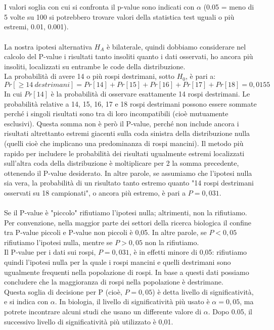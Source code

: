 \documentclass[10pt, draft]{book}
\begin{document}
\\
\\
I valori soglia con cui si confronta il p-value sono indicati con $\alpha$ (0.05 = meno di 5 volte su 100 si potrebbero trovare valori della statistica test uguali o più estremi, 0.01, 0.001).
\\
\\
La nostra ipotesi alternativa $H_A$ è bilaterale, quindi dobbiamo considerare nel calcolo del P-value i risultati tanto insoliti quanto i dati osservati, ho ancora più insoliti, localizzati su entrambe le code della distribuzione.
\\
La probabilità di avere 14 o più rospi destrimani, sotto $H_0$, è pari a:
\begin{equation}
    Pr[\ge 14\ destrimani] = Pr[14] + Pr[15] + Pr[16] + Pr[17] + Pr[18] = 0,0155 
\end{equation}
In cui $Pr[14]$ è la probabilità di osservare esattamente 14 rospi destrimani. Le probabilità relative a 14, 15, 16, 17 e 18 rospi destrimani possono essere sommate perché i singoli risultati sono tra di loro incompatibili (cioè mutuamente esclusivi). Questa somma non è però il P-value, perché non include ancora i risultati altrettanto estremi giacenti sulla coda sinistra della distribuzione nulla (quelli cioè che implicano una predominanza di rospi mancini). Il metodo più rapido per includere le probabilità dei risultati ugualmente estremi localizzati sull'altra coda della distribuzione è moltiplicare per 2 la somma precedente, ottenendo il P-value desiderato. In altre parole, se assumiamo che l'ipotesi nulla sia vera, la probabilità di un risultato tanto estremo quanto "14 rospi destrimani osservati su 18 campionati", o ancora più estremo, è pari a $P = 0,031$. 
\\
\\
Se il P-value è "piccolo" rifiutiamo l'ipotesi nulla; altrimenti, non la rifiutiamo. Per convenzione, nella maggior parte dei settori della ricerca biologica il confine tra P-value piccoli e P-value non piccoli è 0,05. In altre parole, se $P< 0,05$ rifiutiamo l'ipotesi nulla, mentre se $P> 0,05$ non la rifiutiamo.
\\
Il P-value per i dati sui rospi, $P= 0,031$, è in effetti minore di 0,05: rifiutiamo quindi l'ipotesi nulla per la quale i rospi mancini e quelli destrimani sono ugualmente frequenti nella popolazione di rospi. In base a questi dati possiamo concludere che la maggioranza di rospi nella popolazione è destrimane.
\\
Questa soglia di decisione per P (cioè, $P= 0,05$) è detta livello di significatività, e si indica con $\alpha$. In biologia, il livello di significatività più usato è $\alpha = 0,05$, ma potrete incontrare alcuni studi che usano un differente valore di $\alpha$. Dopo 0.05, il successivo livello di significatività più utilizzato è 0,01.
\end{document}

